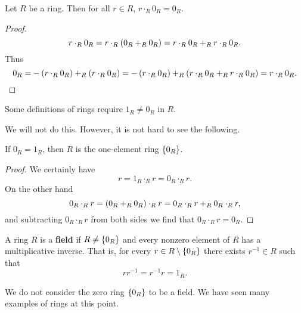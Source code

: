 \pagebreak

\begin{proposition}
Let $ R $ be a ring. Then for all $ r \in R $, $ r \cdot_R 0_R = 0_R $.
\end{proposition}

\begin{proof}
$$ r \cdot_R 0_R = r \cdot_R \br{0_R +_R 0_R} = r \cdot_R 0_R +_R r \cdot_R 0_R. $$
Thus
$$ 0_R = -\br{r \cdot_R 0_R} +_R \br{r \cdot_R 0_R} = -\br{r \cdot_R 0_R} +_R \br{r \cdot_R 0_R +_R r \cdot_R 0_R} = r \cdot_R 0_R. $$
\end{proof}

\begin{note*}
Some definitions of rings require $ 1_R \ne 0_R $ in $ R $.
\end{note*}

We will not do this. However, it is not hard to see the following.

\begin{proposition}
If $ 0_R = 1_R $, then $ R $ is the one-element ring $ \cbr{0_R} $.
\end{proposition}

\begin{proof}
We certainly have
$$ r = 1_R \cdot_R r = 0_R \cdot_R r. $$
On the other hand
$$ 0_R \cdot_R r = \br{0_R +_R 0_R} \cdot_R r = 0_R \cdot_R r +_R 0_R \cdot_R r, $$
and subtracting $ 0_R \cdot_R r $ from both sides we find that $ 0_R \cdot_R r = 0_R $.
\end{proof}

\begin{definition}
A ring $ R $ is a \textbf{field} if $ R \ne \cbr{0_R} $ and every nonzero element of $ R $ has a multiplicative inverse. That is, for every $ r \in R \setminus \cbr{0_R} $ there exists $ r^{-1} \in R $ such that
$$ rr^{-1} = r^{-1}r = 1_R. $$
\end{definition}

We do not consider the zero ring $ \cbr{0_R} $ to be a field. We have seen many examples of rings at this point.

